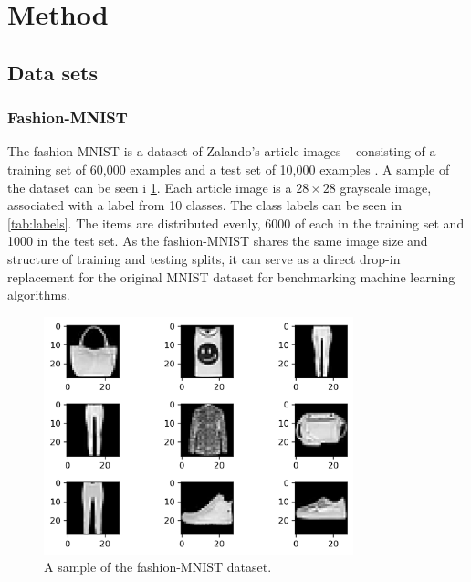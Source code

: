 \documentclass[../main.tex]{subfiles}
\begin{document}
\section{Method}
\subsection{Data sets}
\subsubsection{Fashion-MNIST}
The fashion-MNIST is a dataset of Zalando's article images -- consisting of a training set of 60,000 examples and a test set of 10,000 examples \cite{xiao2017/online}. A sample of the dataset can be seen i \cref{fig:ex_fashion_MNIST}. Each article image is a \ensuremath{28\times28} grayscale image, associated with a label from 10 classes. The class labels can be seen in \cref{tab:labels}. The items are distributed evenly, 6000 of each in the training set and 1000 in the test set. As the fashion-MNIST shares the same image size and structure of training and testing splits, it can serve as a direct drop-in replacement for the original MNIST dataset for benchmarking machine learning algorithms. 

\begin{figure}[!htb]
    \centering
    \includegraphics[width=0.8\textwidth]{doc/fig/example_fashion_mnist.png}
    \caption{A sample of the fashion-MNIST dataset.}
    \label{fig:ex_fashion_MNIST}
\end{figure}
\end{document}
